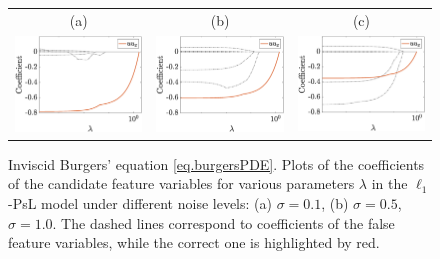 \documentclass[a4paper,11pt]{article}
\theoremstyle{definition}
\begin{document}
\begin{figure}
\centering
\begin{tabular}{ccc}
(a)&(b)&(c)\\
\includegraphics[width=2in]{Figures/burgers_0_1.eps}&
\includegraphics[width=2in]{Figures/burgers_0_5.eps}&
\includegraphics[width=2in]{Figures/burgers_1.eps}
\end{tabular}	
\caption{Inviscid Burgers' equation \eqref{eq.burgersPDE}. Plots of the coefficients of the candidate feature variables for various parameters $\lambda$ in the $\ell_1$-PsL model under different noise levels: (a) $\sigma=0.1$, (b) $\sigma=0.5$, $\sigma=1.0$. The dashed lines correspond to coefficients of the false feature variables, while the correct one is highlighted by red.}\label{expr.burgers}
\end{figure}
\end{document}
